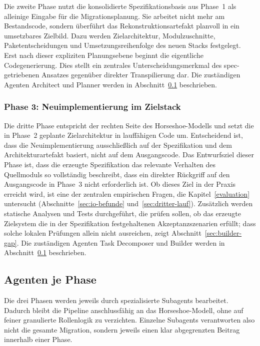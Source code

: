 Die zweite Phase nutzt die konsolidierte Spezifikationsbasis aus Phase~1 als alleinige Eingabe für die Migrationsplanung. Sie arbeitet nicht mehr am Bestandscode, sondern überführt das Rekonstruktionsartefakt planvoll in ein umsetzbares Zielbild. Dazu werden Zielarchitektur, Modulzuschnitte, Paketentscheidungen und Umsetzungsreihenfolge des neuen Stacks festgelegt. Erst nach dieser expliziten Planungsebene beginnt die eigentliche Codegenerierung. Dies stellt ein zentrales Unterscheidungsmerkmal des spec-getriebenen Ansatzes gegenüber direkter Transpilierung dar. Die zuständigen Agenten Architect und Planner werden in Abschnitt~\ref{sec:agenten} beschrieben.

\subsubsection{Phase 3: Neuimplementierung im Zielstack}

Die dritte Phase entspricht der rechten Seite des Horseshoe-Modells und setzt die in Phase~2 geplante Zielarchitektur in lauffähigen Code um. Entscheidend ist, dass die Neuimplementierung ausschließlich auf der Spezifikation und dem Architekturartefakt basiert, nicht auf dem Ausgangscode. Das Entwurfsziel dieser Phase ist, dass die erzeugte Spezifikation das relevante Verhalten des Quellmoduls so vollständig beschreibt, dass ein direkter Rückgriff auf den Ausgangscode in Phase~3 nicht erforderlich ist. Ob dieses Ziel in der Praxis erreicht wird, ist eine der zentralen empirischen Fragen, die Kapitel~\ref{evaluation} untersucht (Abschnitte~\ref{sec:io-befunde} und~\ref{sec:dritter-lauf}). Zusätzlich werden statische Analysen und Tests durchgeführt, die prüfen sollen, ob das erzeugte Zielsystem die in der Spezifikation festgehaltenen Akzeptanzszenarien erfüllt; dass solche lokalen Prüfungen allein nicht ausreichen, zeigt Abschnitt~\ref{sec:builder-gap}. Die zuständigen Agenten Task Decomposer und Builder werden in Abschnitt~\ref{sec:agenten} beschrieben.

\subsection{Agenten je Phase} \label{sec:agenten}

Die drei Phasen werden jeweils durch spezialisierte Subagents bearbeitet. Dadurch bleibt die Pipeline anschlussfähig an das Horseshoe-Modell, ohne auf feiner granulierte Rollenlogik zu verzichten. Einzelne Subagents verantworten also nicht die gesamte Migration, sondern jeweils einen klar abgegrenzten Beitrag innerhalb einer Phase.

